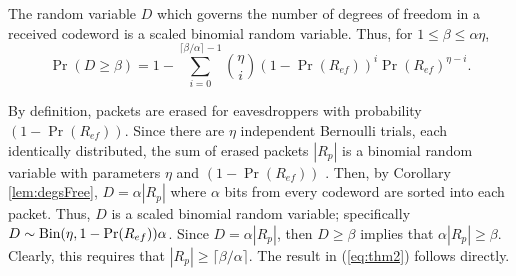 \documentclass[10pt,twocolumn,twoside]{IEEEtran} \newlength{\pic}
\theoremstyle{definition}
\theoremstyle{remark}
\theoremstyle{plain}
\begin{document}
\begin{lemma}\label{lem:DisBinomial}
 The random variable $D$ which governs the number of degrees of freedom in a received codeword is a scaled binomial random variable. Thus, for $1 \leq \beta \leq \alpha \eta$,
 \begin{equation}\label{eq:thm2}
   \Pr(D\geq\beta) = 1 - \sum_{i=0}^{\lceil\beta/\alpha\rceil - 1}{\eta \choose i}(1-\Pr(R_{ef}))^i \Pr(R_{ef})^{\eta-i}.
 \end{equation}
\end{lemma}
\begin{IEEEproof}
 By definition, packets are erased for eavesdroppers with probability $(1-\Pr(R_{ef}))$. Since there are $\eta$ independent Bernoulli trials, each identically distributed, the sum of erased packets $|R_p|$ is a binomial random variable with parameters $\eta$ and $(1-\Pr(R_{ef}))$ \cite{Grimmett_ProbBook}. Then, by Corollary \ref{lem:degsFree}, $D = \alpha |R_p|$ where $\alpha$ bits from every codeword are sorted into each packet. Thus, $D$ is a scaled binomial random variable; specifically $D\sim \textnormal{Bin}(\eta,1-\Pr(R_{ef}))\alpha$. Since $D = \alpha|R_p|$, then $D\geq\beta$ implies that $\alpha|R_p|\geq\beta$. Clearly, this requires that $|R_p|\geq \lceil\beta/\alpha\rceil$. The result in (\ref{eq:thm2}) follows directly.
\end{IEEEproof}
\end{document}
